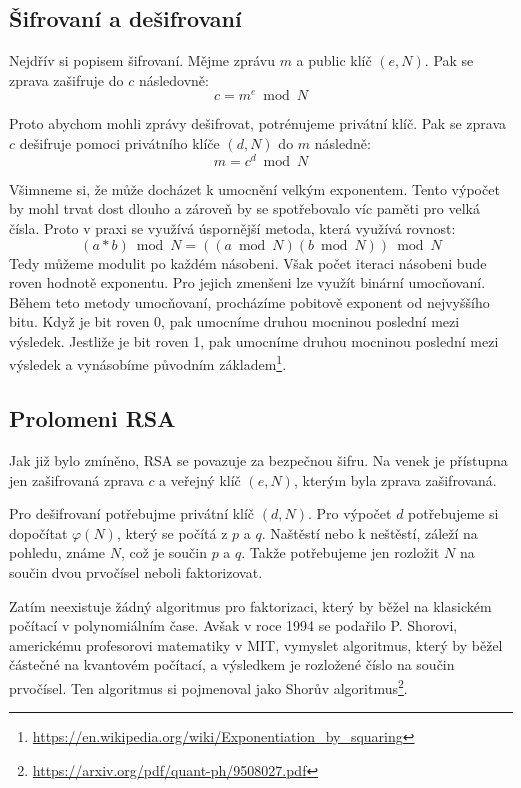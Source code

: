 \documentclass[11pt]{article}
\begin{document}
\subsection{Šifrovaní a dešifrovaní}
Nejdřív si popisem šifrovaní.
Mějme zprávu $m$ a public klíč $(e, N)$.
Pak se zprava zašifruje do $c$ následovně:
$$c = m^e \bmod N$$
\par Proto abychom mohli zprávy dešifrovat, potrénujeme privátní klíč.
Pak se zprava $c$ dešifruje pomoci privátního klíče $(d, N)$ do $m$ následně:
$$m = c^d \bmod N$$
\par Všimneme si, že může docházet k umocnění velkým exponentem.
Tento výpočet by mohl trvat dost dlouho a zároveň by se spotřebovalo víc paměti pro velká čísla.
Proto v praxi se využívá úspornější metoda, která využívá rovnost:
$$(a * b) \bmod N = ((a \bmod N)(b \bmod N)) \bmod N$$
Tedy můžeme modulit po každém násobeni.
Však počet iteraci násobeni bude roven hodnotě exponentu.
Pro jejich zmenšeni lze využít binární umocňovaní.
Během teto metody umocňovaní, procházíme pobitově exponent od nejvyššího bitu.
Když je bit roven 0, pak umocníme druhou mocninou poslední mezi výsledek.
Jestliže je bit roven 1, pak umocníme druhou mocninou poslední mezi výsledek a vynásobíme původním základem\footnote{\url{https://en.wikipedia.org/wiki/Exponentiation_by_squaring}}.

\subsection{Prolomeni RSA}
Jak již bylo zmíněno, RSA se povazuje za bezpečnou šifru.
Na venek je přístupna jen zašifrovaná zprava $c$ a veřejný klíč $(e, N)$, kterým byla zprava zašifrovaná.

\par Pro dešifrovaní potřebujme privátní klíč $(d, N)$.
Pro výpočet $d$ potřebujeme si dopočítat $\varphi (N)$, který se počítá z $p$ a $q$.
Naštěstí nebo k neštěstí, záleží na pohledu, známe $N$, což je součin $p$ a $q$.
Takže potřebujeme jen rozložit $N$ na součin dvou prvočísel neboli faktorizovat.

\par Zatím neexistuje žádný algoritmus pro faktorizaci, který by běžel na klasickém počítací v polynomiálním čase.
Avšak v roce 1994 se podařilo P. Shorovi, americkému profesorovi matematiky v MIT, vymyslet algoritmus, který by běžel částečné na kvantovém počítací, a výsledkem je rozložené číslo na součin prvočísel.
Ten algoritmus si pojmenoval jako Shorův algoritmus\footnote{\url{https://arxiv.org/pdf/quant-ph/9508027.pdf}}.
\end{document}
